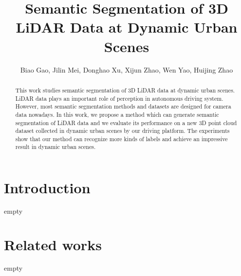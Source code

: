 





\title{Semantic Segmentation of 3D LiDAR Data at Dynamic Urban Scenes}




\author{\authorblockN
	{Biao Gao,
		Jilin Mei, 
		Donghao Xu,
		Xijun Zhao,
		Wen Yao,
		Huijing Zhao}
}



\maketitle

\begin{abstract}
This work studies semantic segmentation of 3D LiDAR data at dynamic urban scenes. LiDAR data plays an important role of perception in autonomous driving system. However, most semantic segmentation methods and datasets are designed for camera data nowadays. In this work, we propose a method which can generate semantic segmentation of LiDAR data and we evaluate its performance on a new 3D point cloud dataset collected in dynamic urban scenes by our driving platform. The experiments show that our method can recognize more kinds of labels and achieve an impressive result in dynamic urban scenes.
\end{abstract}


\section{Introduction}
empty

\section{Related works}
empty

